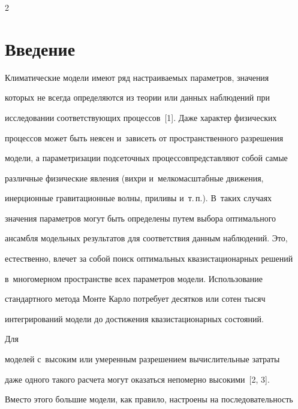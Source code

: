 \begin{multicols}{2}





\label{st\stat}


  


\section{Введение}





  Климатические модели имеют ряд на\-стра\-и\-ва\-емых параметров, значения 


которых не всегда определяются из теории или данных наблюдений при 


исследовании соответствующих процессов~[1]. Даже характер физических 


процессов может быть неясен и~зависеть от пространственного разрешения 


модели, а параметризации подсеточных процессов\linebreak представляют собой самые 


различные физические явления (вихри и~мелкомасштабные движения, 


инерционные гравитационные волны, приливы и~т.\,п.). В~таких случаях 


значения параметров могут быть определены путем выбора оптимального 


ансамбля модельных результатов для соответствия данным наблюдений. Это, 


естественно, влечет за собой поиск оптимальных квазистационарных решений 


в~многомерном пространстве всех па\-ра\-мет\-ров модели. Использование 


стандартного метода Мон\-те Кар\-ло потребует десятков или сотен тысяч 


интегрирований модели до достижения квазистационарных состояний. 





Для 


моделей с~высоким или умеренным разрешением вычислительные затраты 


даже одного такого расчета могут оказаться непомерно высокими~[2, 3]. 


Вместо этого большие модели, как правило, настроены на последовательность 



\end{multicols}
